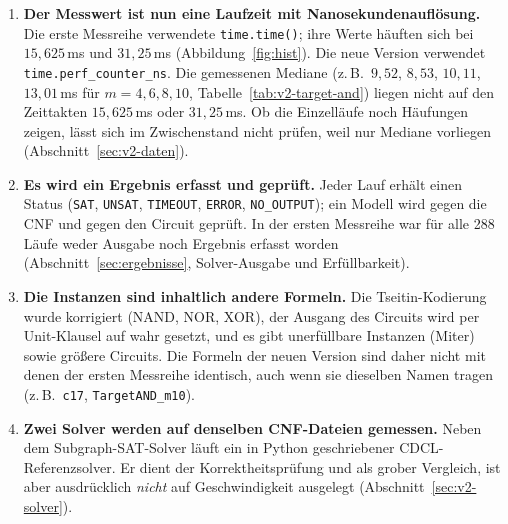 \documentclass[a4paper,12pt]{article}
\theoremstyle{definition}
\begin{document}
\begin{enumerate}
	\item \textbf{Der Messwert ist nun eine Laufzeit mit Nanosekundenauflösung.} Die erste Messreihe verwendete \texttt{time.time()}; ihre Werte häuften sich bei $15{,}625$\,ms und $31{,}25$\,ms (Abbildung~\ref{fig:hist}). Die neue Version verwendet \texttt{time.perf\_counter\_ns}. Die gemessenen Mediane (z.\,B.\ $9{,}52$, $8{,}53$, $10{,}11$, $13{,}01$\,ms für $m=4,6,8,10$, Tabelle~\ref{tab:v2-target-and}) liegen nicht auf den Zeittakten $15{,}625$\,ms oder $31{,}25$\,ms. Ob die Einzelläufe noch Häufungen zeigen, lässt sich im Zwischenstand nicht prüfen, weil nur Mediane vorliegen (Abschnitt~\ref{sec:v2-daten}).
	\item \textbf{Es wird ein Ergebnis erfasst und geprüft.} Jeder Lauf erhält einen Status (\texttt{SAT}, \texttt{UNSAT}, \texttt{TIMEOUT}, \texttt{ERROR}, \texttt{NO\_OUTPUT}); ein Modell wird gegen die CNF und gegen den Circuit geprüft. In der ersten Messreihe war für alle 288 Läufe weder Ausgabe noch Ergebnis erfasst worden (Abschnitt~\ref{sec:ergebnisse}, Solver-Ausgabe und Erfüllbarkeit).
	\item \textbf{Die Instanzen sind inhaltlich andere Formeln.} Die Tseitin-Kodierung wurde korrigiert (NAND, NOR, XOR), der Ausgang des Circuits wird per Unit-Klausel auf wahr gesetzt, und es gibt unerfüllbare Instanzen (Miter) sowie größere Circuits. Die Formeln der neuen Version sind daher nicht mit denen der ersten Messreihe identisch, auch wenn sie dieselben Namen tragen (z.\,B.\ \texttt{c17}, \texttt{TargetAND\_m10}).
	\item \textbf{Zwei Solver werden auf denselben CNF-Dateien gemessen.} Neben dem Subgraph-SAT-Solver läuft ein in Python geschriebener CDCL-Referenzsolver. Er dient der Korrektheitsprüfung und als grober Vergleich, ist aber ausdrücklich \emph{nicht} auf Geschwindigkeit ausgelegt (Abschnitt~\ref{sec:v2-solver}).
\end{enumerate}
\end{document}
